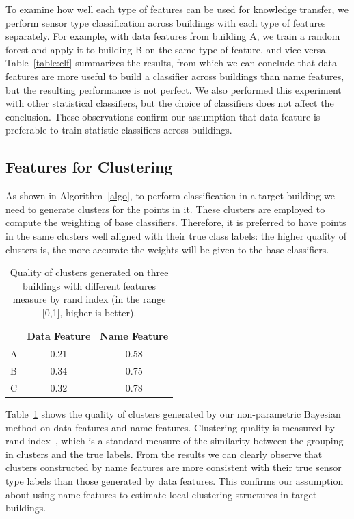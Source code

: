 To examine how well each type of features can be used for knowledge transfer, we perform sensor type classification across buildings with each type of features separately.
For example, with data features from building A, we train a random forest and apply it to building B on the same type of feature, and vice versa.
Table~\ref{table:clf} summarizes the results, from which we can conclude that data features are more useful to build a classifier across buildings than name features, but the resulting performance is not perfect. We also performed this experiment with other statistical classifiers, but the choice of classifiers does not affect the conclusion.
These observations confirm our assumption that data feature is preferable to train statistic classifiers across buildings.

\subsection{Features for Clustering}
As shown in Algorithm~\ref{algo}, to perform classification in a target building we need to generate clusters for the points in it. These clusters are employed to compute the weighting of base classifiers. Therefore, it is preferred to have points in the same clusters well aligned with their true class labels: the higher quality of clusters is, the more accurate the weights will be given to the base classifiers.

\begin{table}[h]
\centering
\begin{tabular}{l|c|c}
\hline
                & Data Feature & Name Feature \\ \hline\hline
A & 0.21       & 0.58       \\
B & 0.34       & 0.75       \\
C & 0.32       & 0.78       \\ \hline
\end{tabular}
\caption{Quality of clusters generated on three buildings with different features measure by rand index (in the range [0,1], higher is better).}
\label{quality}
\end{table}

Table~\ref{quality} shows the quality of clusters generated by our non-parametric Bayesian method on data features and name features.
Clustering quality is measured by rand index~\cite{rand}, which is a standard measure of the similarity between the grouping in clusters and the true labels. From the results we can clearly observe that clusters constructed by name features are more consistent with their true sensor type labels than those generated by data features. This confirms our assumption about using name features to estimate local clustering structures in target buildings.


